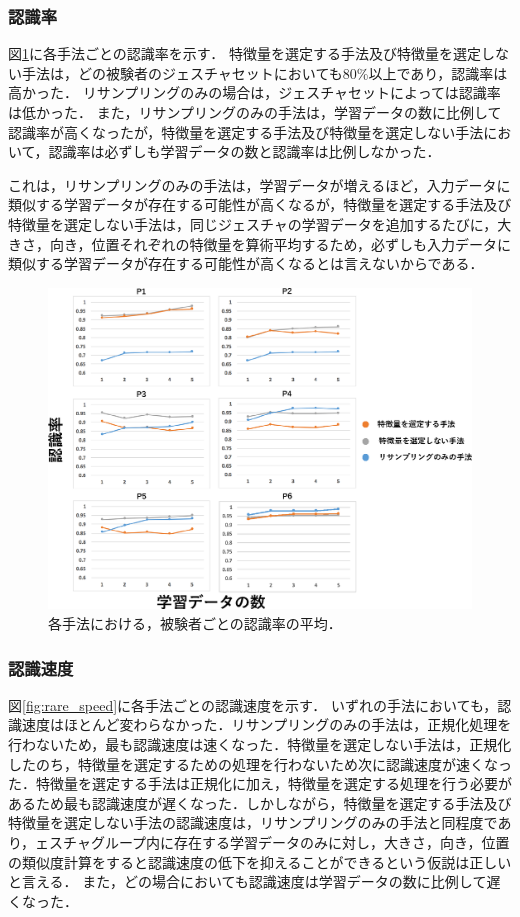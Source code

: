 \subsubsection{認識率}
図\ref{fig:rare_rec}に各手法ごとの認識率を示す．
特徴量を選定する手法及び特徴量を選定しない手法は，どの被験者のジェスチャセットにおいても80\%以上であり，認識率は高かった．
リサンプリングのみの場合は，ジェスチャセットによっては認識率は低かった．
また，リサンプリングのみの手法は，学習データの数に比例して認識率が高くなったが，特徴量を選定する手法及び特徴量を選定しない手法において，認識率は必ずしも学習データの数と認識率は比例しなかった．

これは，リサンプリングのみの手法は，学習データが増えるほど，入力データに類似する学習データが存在する可能性が高くなるが，特徴量を選定する手法及び特徴量を選定しない手法は，同じジェスチャの学習データを追加するたびに，大きさ，向き，位置それぞれの特徴量を算術平均するため，必ずしも入力データに類似する学習データが存在する可能性が高くなるとは言えないからである．

\begin{figure}[!h]
\centering
\includegraphics[width=0.9\columnwidth]{img/pre_rec.eps}
\caption{各手法における，被験者ごとの認識率の平均．}
\label{fig:rare_rec}
\end{figure}

\subsubsection{認識速度}
図\ref{fig:rare_speed}に各手法ごとの認識速度を示す．
いずれの手法においても，認識速度はほとんど変わらなかった．リサンプリングのみの手法は，正規化処理を行わないため，最も認識速度は速くなった．特徴量を選定しない手法は，正規化したのち，特徴量を選定するための処理を行わないため次に認識速度が速くなった．特徴量を選定する手法は正規化に加え，特徴量を選定する処理を行う必要があるため最も認識速度が遅くなった．しかしながら，特徴量を選定する手法及び特徴量を選定しない手法の認識速度は，リサンプリングのみの手法と同程度であり，ェスチャグループ内に存在する学習データのみに対し，大きさ，向き，位置の類似度計算をすると認識速度の低下を抑えることができるという仮説は正しいと言える．
また，どの場合においても認識速度は学習データの数に比例して遅くなった．

